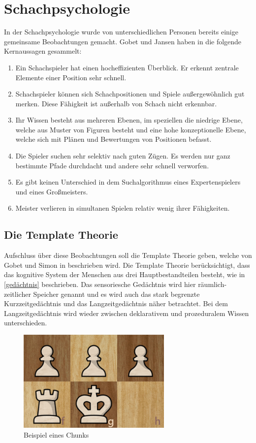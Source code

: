 \section{Schachpsychologie}%
In der Schachpsychologie wurde von unterschiedlichen Personen bereits einige gemeinsame Beobachtungen gemacht. Gobet und Jansen haben in \cite{gobet_training_2006} die folgende Kernaussagen gesammelt:

\begin{enumerate}
    \item Ein Schachspieler hat einen hocheffizienten Überblick. Er erkennt zentrale Elemente einer Position sehr schnell.
    \item Schachspieler können sich Schachpositionen und Spiele außergewöhnlich gut merken. Diese Fähigkeit ist außerhalb von Schach nicht erkennbar.
    \item Ihr Wissen besteht aus mehreren Ebenen, im speziellen die niedrige Ebene, welche aus Muster von Figuren besteht und eine hohe konzeptionelle Ebene, welche sich mit Plänen und Bewertungen von Positionen befasst.
    \item Die Spieler suchen sehr selektiv nach guten Zügen. Es werden nur ganz bestimmte Pfade durchdacht und andere sehr schnell verworfen.
    \item Es gibt keinen Unterschied in dem Suchalgorithmus eines Expertenspielers und eines Großmeisters.
    \item Meister verlieren in simultanen Spielen relativ wenig ihrer Fähigkeiten.
\end{enumerate}

\subsection{Die Template Theorie}
Aufschluss über diese Beobachtungen soll die Template Theorie geben, welche von Gobet und Simon in \cite{gobet_templates_1996} beschrieben wird. Die Template Theorie berücksichtigt, dass das kognitive System der Menschen aus drei Hauptbestandteilen besteht, wie in \autoref{gedächtnis} beschrieben.
Das sensoriesche Gedächtnis wird hier räumlich-zeitlicher Speicher genannt und es wird auch das stark begrenzte Kurzzeitgedächtnis und das Langzeitgedächtnis näher betrachtet.
Bei dem Langzeitgedächtnis wird wieder zwischen deklarativem und prozeduralem Wissen unterschieden.
\cite{gobet_training_2006}

\begin{figure}[b]
    \centering
    \includegraphics[height=5cm]{images/Chunk.png}
    \caption{Beispiel eines Chunks}
    \label{fig:chunk}
\end{figure}

